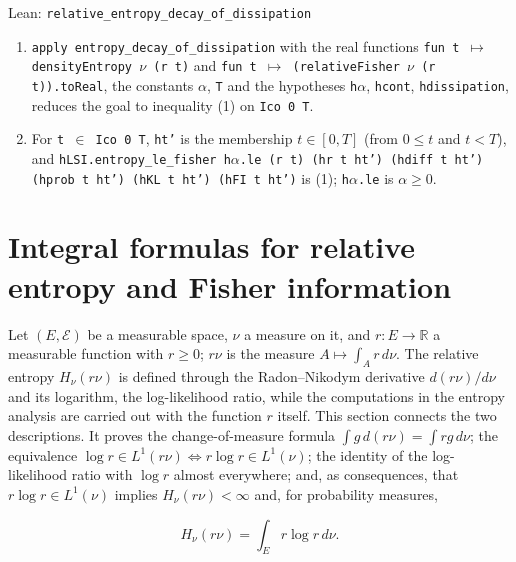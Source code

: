 \documentclass[11pt,a4paper]{report}
\begin{document}
\begin{leanbox}{Lean: \texttt{relative\_\allowbreak{}entropy\_\allowbreak{}decay\_\allowbreak{}of\_\allowbreak{}dissipation}}
\begin{enumerate}


\item \texttt{apply entropy\_\allowbreak{}decay\_\allowbreak{}of\_\allowbreak{}dissipation} with the real functions \texttt{fun t \ensuremath{\mapsto} density\allowbreak{}Entropy \ensuremath{\nu} (r t)} and \texttt{fun t \ensuremath{\mapsto} (relative\allowbreak{}Fisher \ensuremath{\nu} (r t)).\allowbreak{}to\allowbreak{}Real}, the constants \texttt{\ensuremath{\alpha}}, \texttt{T} and the hypotheses \texttt{h\ensuremath{\alpha}}, \texttt{hcont}, \texttt{hdissipation}, reduces the goal to inequality (1) on \texttt{Ico 0 T}.

\item For \texttt{t \ensuremath{\in} Ico 0 T}, \texttt{ht'} is the membership \(t\in[0,T]\) (from \(0\le t\) and \(t<T\)), and \texttt{h\allowbreak{}LSI.\allowbreak{}entropy\_\allowbreak{}le\_\allowbreak{}fisher h\ensuremath{\alpha}.\allowbreak{}le (r t) (hr t ht') (hdiff t ht') (hprob t ht') (h\allowbreak{}KL t ht') (h\allowbreak{}FI t ht')} is (1); \texttt{h\ensuremath{\alpha}.\allowbreak{}le} is \(\alpha\ge0\).

\end{enumerate}
\end{leanbox}
\section{\texorpdfstring{Integral formulas for relative entropy and Fisher information}{Integral formulas for relative entropy and Fisher information}}
\label{proof-module-UnadjustedLangevin-LSI-KLOfDensity-lean}


Let \((E,\mathcal E)\) be a measurable space, \(\nu\) a measure on it, and \(r:E\to\mathbb R\) a measurable function with \(r\ge0\); \(r\nu\) is the measure \(A\mapsto\int_Ar\,d\nu\). The relative entropy \(H_\nu(r\nu)\) is defined through the Radon–Nikodym derivative \(d(r\nu)/d\nu\) and its logarithm, the log-likelihood ratio, while the computations in the entropy analysis are carried out with the function \(r\) itself. This section connects the two descriptions. It proves the change-of-measure formula \(\int g\,d(r\nu)=\int rg\,d\nu\); the equivalence \(\log r\in L^1(r\nu)\iff r\log r\in L^1(\nu)\); the identity of the log-likelihood ratio with \(\log r\) almost everywhere; and, as consequences, that \(r\log r\in L^1(\nu)\) implies \(H_\nu(r\nu)<\infty\) and, for probability measures,


\[H_\nu(r\nu)=\int_Er\log r\,d\nu.\]
\end{document}
